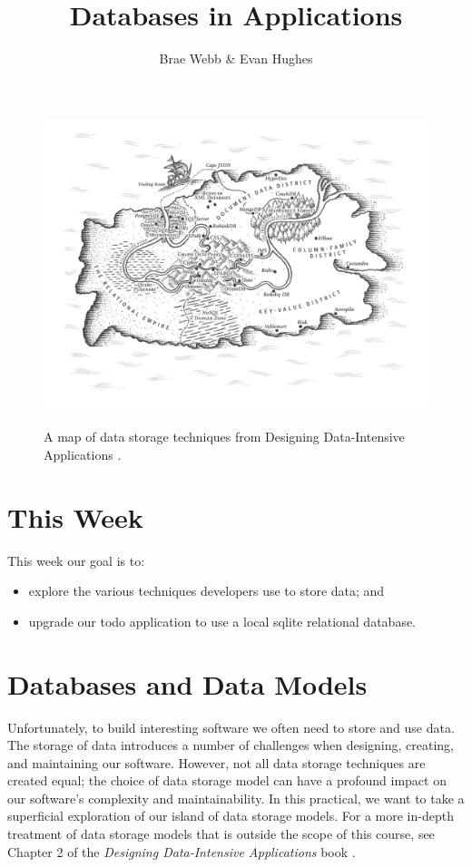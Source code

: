 \documentclass{csse4400}
\title{Databases in Applications}
\author{Brae Webb \& Evan Hughes}
\date{\week{2}}
\begin{document}
\maketitle

\begin{figure}[h]
  \href{https://www.oreilly.com/library/view/designing-data-intensive-applications/9781491903063/ch02.html}{
    \includegraphics[width=\textwidth]{images/databases}
  }
\caption{A map of data storage techniques from Designing Data-Intensive Applications \cite{data-intensive}.}
\end{figure}

\section{This Week}
This week our goal is to:
\begin{itemize}
  \item explore the various techniques developers use to store data; and
  \item upgrade our todo application to use a local sqlite relational database.
\end{itemize}

\clearpage

\section{Databases and Data Models}
Unfortunately, to build interesting software we often need to store and use data.
The storage of data introduces a number of challenges when designing, creating, and maintaining our software.
However, not all data storage techniques are created equal;
the choice of data storage model can have a profound impact on our software's complexity and maintainability.
In this practical, we want to take a superficial exploration of our island of data storage models.
For a more in-depth treatment of data storage models that is outside the scope of this course,
see Chapter 2 of the \textit{Designing Data-Intensive Applications} book \cite{data-intensive}.
\end{document}
